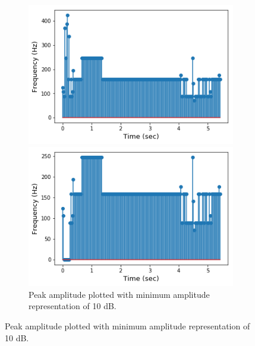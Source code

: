 \begin{figure}[H]
\centering
\begin{subfigure}{0.49\textwidth}
\centering
\includegraphics[width=\textwidth]{figures/peak_detection/20170511_-3.png}
\caption{Peak amplitude plotted with minimum amplitude representation of -3 dB.}
\label{fig:freq_-3dB_Amp_pass}

\includegraphics[width=\textwidth]{figures/peak_detection/20170511_10.png}
\caption{Peak amplitude plotted with minimum amplitude representation of 10 dB.}
\label{fig:freq_10dB_Amp_pass}


\end{subfigure}
\end{figure}
